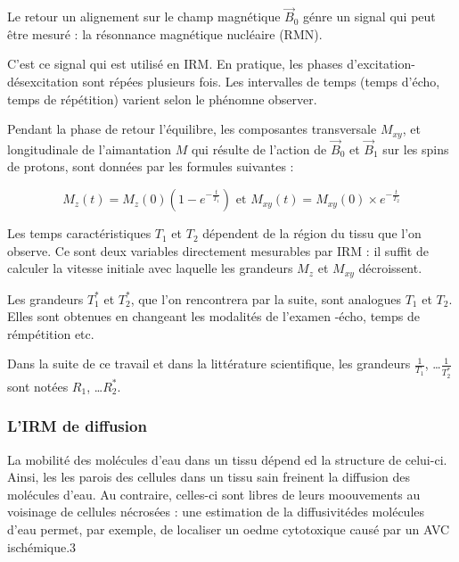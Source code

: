 \par
Le retour  un alignement sur le champ magn\'etique $\vec{B}_0$ g\'enre un signal qui peut \^etre mesur\'e : %
la r\'esonnance magn\'etique nucl\'eaire (RMN).

\par
C'est ce signal qui est utilis\'e en IRM. En pratique, les phases d'excitation-d\'esexcitation sont r\'ep\'ees plusieurs fois. %
Les intervalles de temps (temps d'\'echo, temps de r\'ep\'etition) varient selon le ph\'enomne  observer.

\etoile

\newpage
Pendant la phase de retour  l'\'equilibre, les composantes transversale $M_{xy}$, %
et longitudinale de l'aimantation $M$ qui r\'esulte de l'action de $\vec{B}_0$ et $\vec{B}_1$ sur les spins de protons, %
sont donn\'ees par les formules suivantes :

\[M_z(t)=M_z(0)\left(1-e^{-\frac{t}{T_1}}\right)\text{ et }M_{xy}(t)=M_{xy}(0)\times e^{-\frac{t}{T_2}}\]

Les temps caract\'eristiques $T_1$ et $T_2$ d\'ependent de la r\'egion du tissu que l'on observe. %
Ce sont deux variables directement mesurables par IRM : %
il suffit de calculer la vitesse initiale avec laquelle les grandeurs $M_z$ et $M_{xy}$ d\'ecroissent.

\par
Les grandeurs $T_1^{\ast}$ et $T_2^{\ast}$, que l'on rencontrera par la suite, sont analogues  $T_1$ et $T_2$. %
Elles sont obtenues en changeant les modalit\'es de l'examen -\'echo, temps de r\'emp\'etition etc.

\etoile
Dans la suite de ce travail et dans la litt\'erature scientifique, %
les grandeurs $\frac{1}{T_1}$, \dots $\frac{1}{T_2^{\ast}}$ sont not\'ees $R_1$, \dots $R_2^{\ast}$.

\FloatBarrier
\subsubsection{L'IRM de diffusion}

La mobilit\'e des mol\'ecules d'eau dans un tissu d\'epend ed la structure de celui-ci. %
Ainsi, les les parois des cellules dans un tissu sain freinent la diffusion des mol\'ecules d'eau. %
Au contraire, celles-ci sont libres de leurs moouvements au voisinage de cellules n\'ecros\'ees : %
une estimation de la diffusivit\'edes mol\'ecules d'eau permet, par exemple, de localiser un oedme cytotoxique caus\'e par un AVC isch\'emique.3

